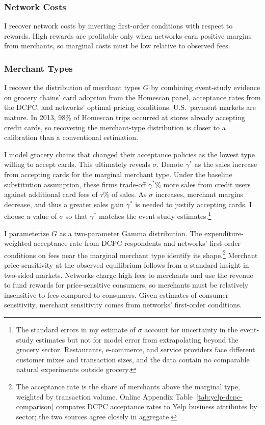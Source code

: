 \documentclass[main.tex]{subfiles}
\begin{document}
\subsubsection{Network Costs}

I recover network costs by inverting first-order conditions with respect to rewards.
High rewards are profitable only when networks earn positive margins from merchants, so marginal costs must be low relative to observed fees.

\subsubsection{Merchant Types}
\label{subsubsec:estim-merchant-types}

I recover the distribution of merchant types $G$ by combining event-study evidence on grocery chains' card adoption from the Homescan panel, acceptance rates from the DCPC, and networks' optimal pricing conditions.
U.S.\ payment markets are mature. In 2013, 98\% of Homescan trips occurred at stores already accepting credit cards, so recovering the merchant-type distribution is closer to a calibration than a conventional estimation.

I model grocery chains that changed their acceptance policies as the lowest type willing to accept cards. This ultimately reveals $\sigma$.
Denote $\gamma^*$ as the sales increase from accepting cards for the marginal merchant type.
Under the baseline substitution assumption, these firms trade-off $\gamma^*$\% more sales from credit users against additional card fees of $\tau\%$ of sales.
As $\sigma$ increases, merchant margins decrease, and thus a greater sales gain $\gamma^*$ is needed to justify accepting cards.
I choose a value of $\sigma$ so that $\gamma^*$ matches the event study estimates.\footnote{
    The standard errors in my estimate of $\sigma$ account for uncertainty in the event-study estimates but not for model error from extrapolating beyond the grocery sector.
    Restaurants, e-commerce, and service providers face different customer mixes and transaction sizes, and the data contain no comparable natural experiments outside grocery.
}

I parameterize $G$ as a two-parameter Gamma distribution.
The expenditure-weighted acceptance rate from DCPC respondents and networks' first-order conditions on fees near the marginal merchant type identify its shape.\footnote{The acceptance rate is the share of merchants above the marginal type, weighted by transaction volume. Online Appendix Table~\ref{tab:yelp-dcpc-comparison} compares DCPC acceptance rates to Yelp business attributes by sector; the two sources agree closely in aggregate.}
Merchant price-sensitivity at the observed equilibrium follows from a standard insight in two-sided markets.
Networks charge high fees to merchants and use the revenue to fund rewards for price-sensitive consumers, so merchants must be relatively insensitive to fees compared to consumers.
Given estimates of consumer sensitivity, merchant sensitivity comes from networks' first-order conditions.
\end{document}
